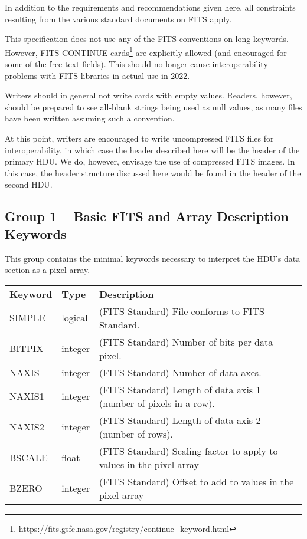 \documentclass[11pt]{ivoa}
\begin{document}
In addition to the requirements and recommendations given here, all
constraints resulting from the various standard documents on FITS apply.

This specification does not use any of the FITS conventions on long
keywords.  However, FITS CONTINUE
cards\footnote{\url{https://fits.gsfc.nasa.gov/registry/continue_keyword.html}}
are explicitly
allowed (and encouraged for some of the free text fields).  This should
no longer cause interoperability problems with FITS libraries in actual
use in 2022.

Writers should in general not write cards with empty values.  Readers,
however, should be prepared to see all-blank strings being used as null
values, as many files have been written assuming such a convention.

At this point, writers are encouraged to write uncompressed FITS files
for interoperability, in which case the header described here will be
the header of the primary HDU.  We do, however, envisage the use of
compressed FITS images.  In this case, the header structure discussed
here would be found in the header of the second HDU.


\subsection{Group 1 -- Basic FITS and Array Description Keywords}

This group contains the minimal keywords necessary to interpret the
HDU's data section as a pixel array.

\begin{inlinetable}
\footnotesize
\begin{tabular}{llp{}}
\sptablerule
\textbf{Keyword}&\textbf{Type}&\textbf{Description}\\
\sptablerule
SIMPLE     &logical     &(FITS Standard) File conforms to FITS Standard.\\
BITPIX     &integer     &(FITS Standard) Number of bits per data pixel.\\
NAXIS      &integer     &(FITS Standard) Number of data axes.\\
NAXIS1     &integer     &(FITS Standard) Length of data axis 1
(number of pixels in a row).\\
NAXIS2     &integer     &(FITS Standard) Length of data axis 2
(number of rows).\\
BSCALE     &float             &(FITS Standard) Scaling factor to apply
to values in the pixel array\\
BZERO      &integer     &(FITS Standard) Offset to add to values in the
pixel array\\
\end{tabular}
\end{inlinetable}
\end{document}

